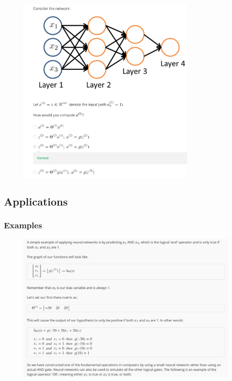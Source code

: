 \documentclass[12pt, A4,onecolumn]{article} %
\begin{document}
\begin{figure}[H]
	\centering
	\includegraphics[width=0.8\textwidth]{./ImagenesW4/testmrep2}
\end{figure}



\subsection{Applications}

\subsubsection{Examples}

\begin{figure}[H]
	\centering
	\includegraphics[width=1\textwidth]{./ImagenesW4/examplesI1}
\end{figure}
\end{document}
